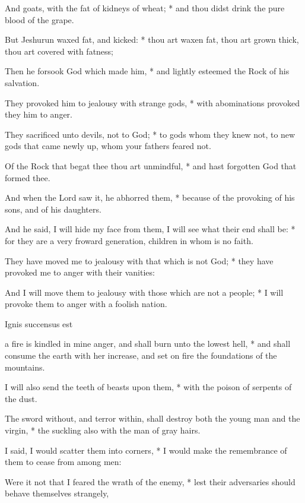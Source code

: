 \begin{multicols}{2}
And goats, with the fat of kidneys of wheat; * and thou didst drink the pure blood of the grape.\par
But Jeshurun waxed fat, and kicked: * thou art waxen fat, thou art grown thick, thou art covered with fatness;\par
Then he forsook God which made him, * and lightly esteemed the Rock of his salvation.\par
They provoked him to jealousy with strange gods, * with abominations provoked they him to anger.\par
They sacrificed unto devils, not to God; * to gods whom they knew not, to new gods that came newly up, whom your fathers feared not.\par
Of the Rock that begat thee thou art unmindful, * and hast forgotten God that formed thee.\par
And when the Lord saw it, he abhorred them, * because of the provoking of his sons, and of his daughters.\par
And he said, I will hide my face from them, {\dag} I will see what their end shall be: * for they are a very froward generation, children in whom is no faith.\par
They have moved me to jealousy with that which is not God; * they have provoked me to anger with their vanities:\par
And I will move them to jealousy with those which are not a people; * I will provoke them to anger with a foolish nation.
\begin{inhead}
Ignis succensus est
\end{inhead}
 a fire is kindled in mine anger, {\dag} and shall burn unto the lowest hell, * and shall consume the earth with her increase, and set on fire the foundations of the mountains.\par
{}
I will also send the teeth of beasts upon them, * with the poison of serpents of the dust.\par
The sword without, and terror within, {\dag} shall destroy both the young man and the virgin, * the suckling also with the man of gray hairs.\par
I said, I would scatter them into corners, * I would make the remembrance of them to cease from among men:\par
Were it not that I feared the wrath of the enemy, * lest their adversaries should behave themselves strangely,\par

\end{multicols}
